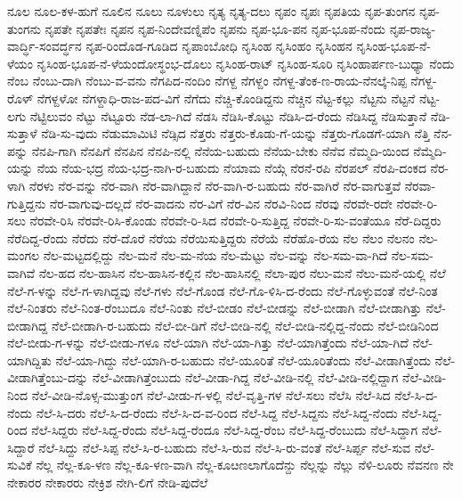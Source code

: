 ನೂಲ
ನೂಲ-ಕಳ-ಹುಗೆ
ನೂಲಿನ
ನೂಲು
ನೂಳುಲು
ನೃತ್ಯ
ನೃತ್ಯ-ದಲು
ನೃಪಂ
ನೃಪಃ
ನೃಪತಿಯ
ನೃಪ-ತುಂಗನ
ನೃಪ-ತುಂಗನು
ನೃಪತೇ
ನೃಪತೇಃ
ನೃಪನ
ನೃಪ-ನಿಂದೇವಣ್ನಿಪೆಂ
ನೃಪನು
ನೃಪ-ಭೂ-ಪನ
ನೃಪ-ಭೂಪ-ನೆಂದು
ನೃಪ-ರಾಜ್ಯ-ವಾರ್ದ್ಧಿ-ಸಂವರ್ದ್ಧನ
ನೃಪ-ರಿಂದೊಡ-ಗೂಡಿದ
ನೃಪಾಂಬೋಧಿ
ನೃಸಿಂಹ
ನೃಸಿಂಹಂ
ನೃಸಿಂಹನ
ನೃಸಿಂಹ-ಭೂಪ-ನೆ-ಳೆಯಂ
ನೃಸಿಂಹ-ಭೂಪ-ನೆ-ಳೆಯಂದೋಸ್ಥಂಭ-ದೊಲು
ನೃಸಿಂಹ-ರಾಟ್
ನೃಸಿಂಹ-ಸೂರಿ
ನೃಸಿಂಹಾರ್ಪಣ-ಬುಧ್ಯಾ
ನೆಂದು
ನೆಂಬ
ನೆಂಬು-ದಾಗಿ
ನೆಂಬು-ವ-ವನು
ನೆಗಪಿದ-ನಂದಿಂ
ನೆಗಳ್ದ
ನೆಗಳ್ದಂ
ನೆಗಳ್ದ-ತೆಂಕ-ಣ-ರಾಯ-ನೆನಲ್ಕೆ-ನಿಪ್ಪ
ನೆಗಳ್ದ-ರೊಳ್
ನೆಗಳ್ದಳೋ
ನೆಗಳ್ದಾಧಿ-ರಾಜ-ಪದ-ವಿಗೆ
ನೆಗೆದು
ನೆಚ್ಚಿ-ಕೊಂಡಿದ್ದನು
ನೆಚ್ಚಿನ
ನೆಟ್ಟ-ಕಲ್ಲು
ನೆಟ್ಟನು
ನೆಟ್ಟನೆ
ನೆಟ್ಟ-ಲಗು
ನೆಟ್ಟಿಲುವಂ
ನೆಟ್ಟು
ನೆಟ್ಟೂರು
ನೆಡ-ಲಾ-ಗಿದೆ
ನೆಡಸಿ
ನೆಡಿಸಿ-ಕೊಟ್ಟು
ನೆಡಿಸಿ-ದ-ರೆಂದು
ನೆಡಿಸಿದ್ದ
ನೆಡಿಸುತ್ತಾನೆ
ನೆಡಿ-ಸುತ್ತಾಳೆ
ನೆಡಿ-ಸು-ವುದು
ನೆಡುಮಾಮಿಟಿ
ನೆಡ್ಸಿದ
ನೆತ್ತರು
ನೆತ್ತರು-ಕೊಡು-ಗೆ-ಯನ್ನು
ನೆತ್ತರು-ಗೊಡಗೆ-ಯಾಗಿ
ನೆತ್ತಿ
ನೆನ-ಪನ್ನು
ನೆನಪಿ-ಗಾಗಿ
ನೆನಪಿಗೆ
ನೆನಪಿನ
ನೆನಪಿ-ನಲ್ಲಿ
ನೆನೆಯ-ಬಹುದು
ನೆನೆಯ-ಬೇಕು
ನೆನೆವ
ನೆಮ್ಮದಿ-ಯಿಂದ
ನೆಮ್ಮೆದಿ-ಯನ್ನು
ನೆಯ
ನೆಯ-ಭದ್ರ
ನೆಯ-ಭದ್ರ-ನಾಗಿ-ರ-ಬಹುದು
ನೆಯಾಮ
ನೆಯ್ಗೆ
ನೆರನೆ-ರಪಿ
ನೆರಪಲ್
ನೆರಪಿ-ದಂಕದ
ನೆರ-ಳಾಗಿ
ನೆರಳು
ನೆರ-ವನ್ನು
ನೆರ-ವಾಗಿ
ನೆರ-ವಾಗಿದ್ದಾನೆ
ನೆರ-ವಾಗಿ-ರ-ಬಹುದು
ನೆರ-ವಾಗಿರೆ
ನೆರ-ವಾಗುತ್ತವೆ
ನೆರವಾ-ಗುತ್ತಿದ್ದನು
ನೆರ-ವಾಗುವು-ದಲ್ಲದೆ
ನೆರ-ವಾದನು
ನೆರ-ವಿಗೆ
ನೆರ-ವಿನ
ನೆರವಿ-ನಿಂದ
ನೆರವು
ನೆರವೇ-ರದೇ
ನೆರವೇ-ರಿ-ಸಲು
ನೆರವೇ-ರಿಸಿ
ನೆರವೇ-ರಿಸಿ-ಕೊಂಡು
ನೆರವೇ-ರಿ-ಸಿದ
ನೆರವೇ-ರಿ-ಸುತ್ತಿದ್ದ
ನೆರವೇ-ರಿ-ಸು-ವಂತೆಯೂ
ನೆರೆ-ದಿದ್ದರು
ನೆರೆದಿದ್ದ-ರೆಂದು
ನೆರೆದು
ನೆರೆ-ದೊರೆ
ನೆರೆಯ
ನೆರೆಯಿಸುತ್ತಿದ್ದರು
ನೆರೆಯೆ
ನೆರೆಹೊ-ರೆಯ
ನೆಲ
ನೆಲಂ
ನೆಲನಂ
ನೆಲ-ಮಂಗಲ
ನೆಲ-ಮಟ್ಟದಲ್ಲಿದ್ದು
ನೆಲ-ಮನೆ
ನೆಲ-ಮ-ನೆಯ
ನೆಲ-ಮೆಟ್ಟು
ನೆಲ-ವನ್ನು
ನೆಲ-ಸಮ-ವಾ-ಗಿದೆ
ನೆಲ-ಸಮ-ವಾಗಿವೆ
ನೆಲ-ಹದ
ನೆಲ-ಹಾಸಿನ
ನೆಲ-ಹಾಸಿನ-ಕಲ್ಲಿನ
ನೆಲ-ಹಾಸಿನಲ್ಲಿ
ನೆಲಾ-ಪುರ
ನೆಲು-ಮನೆ
ನೆಲು-ಮನೆ-ಯಲ್ಲಿ
ನೆಲೆ
ನೆಲೆ-ಗ-ಳನ್ನು
ನೆಲೆ-ಗ-ಳಾಗಿದ್ದವು
ನೆಲೆ-ಗಳು
ನೆಲೆ-ಗೊಂಡ
ನೆಲೆ-ಗೊ-ಳಿಸಿ-ದ-ರೆಂದು
ನೆಲೆ-ಗೊಳ್ಳುವಂತೆ
ನೆಲೆ-ನಿಂತ
ನೆಲೆ-ನಿಂತರು
ನೆಲೆ-ನಿಂತ-ರೆಂಬುದೂ
ನೆಲೆ-ನಿಂತು
ನೆಲೆ-ಬೀಡಂ
ನೆಲೆ-ಬೀಡನ್ನು
ನೆಲೆ-ಬೀಡಾಗಿ
ನೆಲೆ-ಬೀಡಾಗಿತ್ತು
ನೆಲೆ-ಬೀಡಾಗಿದ್ದ
ನೆಲೆ-ಬೀಡಾಗಿ-ರ-ಬಹುದು
ನೆಲೆ-ಬೀ-ಡಿಗೆ
ನೆಲೆ-ಬೀಡಿ-ನಲ್ಲಿ
ನೆಲೆ-ಬೀಡಿ-ನಲ್ಲಿದ್ದ-ನೆಂದು
ನೆಲೆ-ಬೀಡಿನಿಂದ
ನೆಲೆ-ಬೀಡು-ಗ-ಳನ್ನು
ನೆಲೆ-ಬೀಡು-ಗಳೂ
ನೆಲೆ-ಯಾಗಿ
ನೆಲೆ-ಯಾ-ಗಿತ್ತು
ನೆಲೆ-ಯಾಗಿತ್ತೆಂದು
ನೆಲೆ-ಯಾ-ಗಿದೆ
ನೆಲೆ-ಯಾಗಿದ್ದಿತು
ನೆಲೆ-ಯಾ-ಗಿದ್ದು
ನೆಲೆ-ಯಾಗಿ-ರ-ಬಹುದು
ನೆಲೆ-ಯೂರಿತೆ
ನೆಲೆ-ಯೂರಿತೆಂದು
ನೆಲೆ-ವೀಡಾಗಿತ್ತೆಂದು
ನೆಲೆ-ವೀಡಾಗಿತ್ತೆಂಬು-ದನ್ನು
ನೆಲೆ-ವೀಡಾಗಿತ್ತೆಂಬುದು
ನೆಲೆ-ವೀಡಾ-ಗಿದ್ದ
ನೆಲೆ-ವೀಡಿ-ನಲ್ಲಿ
ನೆಲೆ-ವೀಡಿ-ನಲ್ಲಿದ್ದಾಗ
ನೆಲೆ-ವೀಡಿ-ನಿಂದ
ನೆಲೆ-ವೀಡಿ-ನೊಳ್ಸ-ಮುತ್ತುಂಗ
ನೆಲೆ-ವೀಡು-ಗ-ಳಲ್ಲಿ
ನೆಲೆ-ವೃತ್ತಿ-ಗಳ
ನೆಲೆ-ಸಲು
ನೆಲೆಸಿ
ನೆಲೆ-ಸಿದ
ನೆಲೆ-ಸಿ-ದ-ನೆಂದು
ನೆಲೆ-ಸಿ-ದರು
ನೆಲೆ-ಸಿ-ದ-ರೆಂದು
ನೆಲೆ-ಸಿ-ದ-ವ-ರಿಂದ
ನೆಲೆ-ಸಿದ್ದ
ನೆಲೆ-ಸಿದ್ದನು
ನೆಲೆ-ಸಿದ್ದ-ನೆಂದು
ನೆಲೆ-ಸಿದ್ದ-ರಿಂದ
ನೆಲೆ-ಸಿದ್ದರು
ನೆಲೆ-ಸಿದ್ದ-ರೆಂದು
ನೆಲೆ-ಸಿದ್ದ-ರೆಂದೂ
ನೆಲೆ-ಸಿದ್ದ-ರೆಂಬ
ನೆಲೆ-ಸಿದ್ದ-ರೆಂಬುದು
ನೆಲೆ-ಸಿದ್ದಾಗ
ನೆಲೆ-ಸಿದ್ದಾರೆ
ನೆಲೆ-ಸಿದ್ದು
ನೆಲೆ-ಸಿಪ್ಪ
ನೆಲೆ-ಸಿ-ರ-ಬಹುದು
ನೆಲೆ-ಸಿ-ರುವ
ನೆಲೆ-ಸಿ-ರು-ವಂತೆ
ನೆಲೆ-ಸಿರ್ಪ್ಪ
ನೆಲೆ-ಸುವ
ನೆಲೆ-ಸುವಿಕೆ
ನೆಲ್ಲ
ನೆಲ್ಲ-ಕೂ-ಳಣ
ನೆಲ್ಲ-ಕೂ-ಳಣ-ವಾಗಿ
ನೆಲ್ಲ-ಕೂೞಣಲಾಗೊದೆನ್ದು
ನೆಲ್ಲನ್ನು
ನೆಲ್ಲು
ನೆಳಿ-ಲೂರು
ನೆವನಣ
ನೇ
ನೇಕಾರರ
ನೇಕಾರರು
ನೇಕ್ರಿಶ
ನೇಗಿ-ಲಿಗೆ
ನೇಡಿ-ಪುದೆಲೆ

